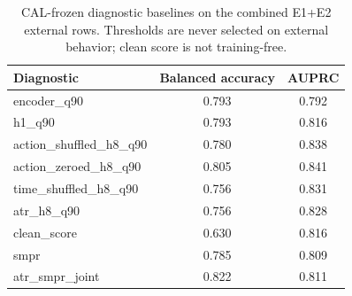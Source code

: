 \begin{table}[H]
\centering
\caption{CAL-frozen diagnostic baselines on the combined E1+E2 external rows. Thresholds are never selected on external behavior; clean score is not training-free.}
\label{tab:diagnostic-baselines}
\begin{tabular}{lcc}
\toprule
Diagnostic & Balanced accuracy & AUPRC \\
\midrule
encoder\_q90 & 0.793 & 0.792 \\
h1\_q90 & 0.793 & 0.816 \\
action\_shuffled\_h8\_q90 & 0.780 & 0.838 \\
action\_zeroed\_h8\_q90 & 0.805 & 0.841 \\
time\_shuffled\_h8\_q90 & 0.756 & 0.831 \\
atr\_h8\_q90 & 0.756 & 0.828 \\
clean\_score & 0.630 & 0.816 \\
smpr & 0.785 & 0.809 \\
atr\_smpr\_joint & 0.822 & 0.811 \\
\bottomrule
\end{tabular}
\end{table}
